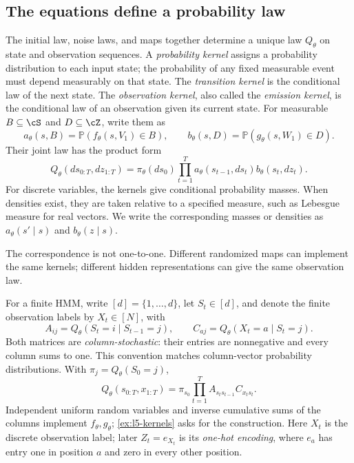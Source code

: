 \documentclass[11pt,twoside]{article}
\renewcommand{\P}{\mathbb P}
\theoremstyle{definition}
\theoremstyle{remark}
\begin{document}
\subsection{The equations define a probability law}
\label{sec:model-law}

The initial law, noise laws, and maps together determine a unique law
\(Q_\theta\) on state and observation sequences. A \emph{probability kernel}
assigns a probability distribution to each input state; the probability
of any fixed measurable event must depend measurably on that state.
The \emph{transition kernel} is the conditional law of the next state.
The \emph{observation kernel}, also called the \emph{emission kernel},
is the conditional law of an observation given its current state.
For measurable \(B\subseteq\cS\) and \(D\subseteq\cZ\), write them as
\[
 a_\theta(s,B)=\P(f_\theta(s,V_1)\in B),\qquad
 b_\theta(s,D)=\P(g_\theta(s,W_1)\in D).
\]
Their joint law has the product form
\begin{equation}
 Q_\theta(ds_{0:T},dz_{1:T})
 =\pi_\theta(ds_0)\prod_{t=1}^T
 a_\theta(s_{t-1},ds_t)b_\theta(s_t,dz_t).
 \label{eq:ssm-joint}
\end{equation}
For discrete variables, the kernels give conditional probability masses.
When densities exist, they are taken relative to a specified measure,
such as Lebesgue measure for real vectors. We write the corresponding
masses or densities as \(a_\theta(s'\mid s)\) and \(b_\theta(z\mid s)\).

The correspondence is not one-to-one. Different randomized maps can
implement the same kernels; different hidden representations can give
the same observation law.

For a finite HMM, write \([d]=\{1,\ldots,d\}\), let \(S_t\in[d]\),
and denote the finite observation labels by \(X_t\in[N]\), with
\[
 A_{ij}=Q_\theta(S_t=i\mid S_{t-1}=j),\qquad
 C_{aj}=Q_\theta(X_t=a\mid S_t=j).
\]
Both matrices are \emph{column-stochastic}: their entries are nonnegative
and every column sums to one. This convention matches column-vector probability
distributions. With \(\pi_j=Q_\theta(S_0=j)\),
\begin{equation}
 Q_\theta(s_{0:T},x_{1:T})
 =\pi_{s_0}\prod_{t=1}^T A_{s_ts_{t-1}}C_{x_ts_t}.
 \label{eq:hmm-joint}
\end{equation}
Independent uniform random variables and inverse cumulative sums of the
columns implement \(f_\theta,g_\theta\); \cref{ex:l5-kernels} asks for
the construction. Here \(X_t\) is the discrete observation label;
later \(Z_t=e_{X_t}\) is its \emph{one-hot encoding}, where \(e_a\) has
entry one in position \(a\) and zero in every other position.
\end{document}
